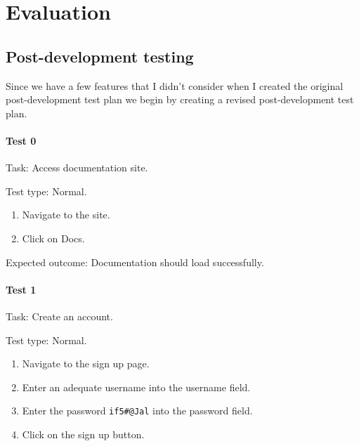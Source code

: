 \pagestyle{fancy} 
\chead{\mdseries \thepage}

\chapter{Evaluation}
\label{chap:evaluation}

\section{Post-development testing}

Since we have a few features that I didn't consider when I created the original post-development test plan we begin
by creating a revised post-development test plan.

\subsubsection{Test 0}

{\sffamily Task:} Access documentation site. \\

{\color{gray} \hrulefill}

{\sffamily Test type: Normal.}

\begin{enumerate}
  \item Navigate to the site.
  \item Click on Docs.
\end{enumerate}

{\sffamily Expected outcome:} Documentation should load successfully. \\

{\color{gray} \hrulefill}

\subsubsection{Test 1}

{\sffamily Task:} Create an account.\\

{\color{gray} \hrulefill}

{\sffamily Test type: Normal.}

\begin{enumerate}
  \item Navigate to the sign up page.
  \item Enter an adequate username into the username field.
  \item Enter the password \texttt{if5\#@Jal} into the password field.
  \item Click on the sign up button.
\end{enumerate}

